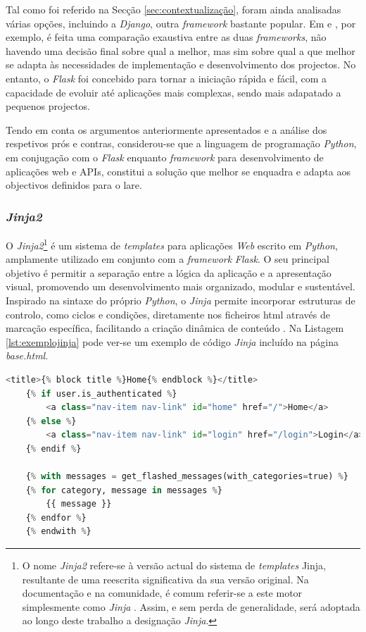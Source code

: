 Tal como foi referido na Secção \ref{sec:contextualização}, foram ainda analisadas várias opções, incluindo a \textit{Django}, outra \textit{framework} bastante popular. Em \cite{Djangovsflask} e \cite{FlaskvsDjango}, por exemplo, é feita uma comparação exaustiva entre as duas \textit{frameworks}, não havendo uma decisão final sobre qual a melhor, mas sim sobre qual a que melhor se adapta às necessidades de implementação e desenvolvimento dos projectos. No entanto, o \textit{Flask} foi concebido para tornar a iniciação rápida e fácil, com a capacidade de evoluir até aplicações mais complexas, sendo mais adapatado a pequenos projectos.

Tendo em conta os argumentos anteriormente apresentados e a análise dos respetivos prós e contras, considerou-se que a linguagem de programação \textit{Python}, em conjugação com o \textit{Flask} enquanto \textit{framework} para desenvolvimento de aplicações web e APIs, constitui a solução que melhor se enquadra e adapta aos objectivos definidos para o \acrshort{lare}.

\subsubsection{\textit{Jinja2}}
\label{sec:jinja2}
O \textit{Jinja2}\footnote{O nome \textit{Jinja2} refere-se à versão actual do sistema de \textit{templates} Jinja, resultante de uma reescrita significativa da sua versão original. Na documentação e na comunidade, é comum referir-se a este motor simplesmente como \textit{Jinja} \cite{Jinja}. Assim, e sem perda de generalidade, será adoptada ao longo deste trabalho a designação \textit{Jinja}.} é um sistema de \textit{templates} para aplicações \textit{Web} escrito em \textit{Python}, amplamente utilizado em conjunto com a \textit{framework} \textit{Flask}. O seu principal objetivo é permitir a separação entre a lógica da aplicação e a apresentação visual, promovendo um desenvolvimento mais organizado, modular e sustentável. Inspirado na sintaxe do próprio \textit{Python}, o \textit{Jinja} permite incorporar estruturas de controlo, como ciclos e condições, diretamente nos ficheiros \acrshort{html} através de marcação específica, facilitando a criação dinâmica de conteúdo \cite{Jinja}. Na Listagem \ref{lst:exemplojinja} pode ver-se um exemplo de código \textit{Jinja} incluído na página \textit{base.html}.

\begin{minipage}{0.9\linewidth}
    \begin{lstlisting}[language=python, caption=Exemplo \textit{Jinja} incluído na página \textit{base.html}, label=lst:exemplojinja]
	<title>{% block title %}Home{% endblock %}</title>
    {% if user.is_authenticated %}
        <a class="nav-item nav-link" id="home" href="/">Home</a>
    {% else %}
        <a class="nav-item nav-link" id="login" href="/login">Login</a>
    {% endif %}

    {% with messages = get_flashed_messages(with_categories=true) %}
    {% for category, message in messages %}
        {{ message }}
    {% endfor %}
    {% endwith %}

	\end{lstlisting}
\end{minipage}

